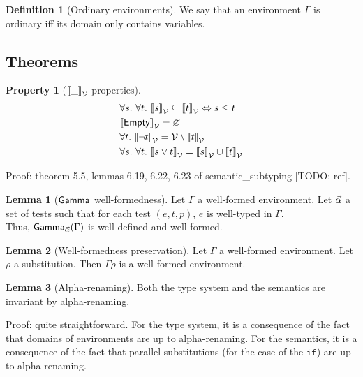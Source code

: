 \documentclass[a4paper]{article}
\theoremstyle{definition}
\newtheorem{lemma}{Lemma}
\newtheorem{definition}{Definition}
\newtheorem{property}{Property}
\begin{document}
      \begin{definition}[Ordinary environments]
        We say that an environment $\Gamma$ is ordinary iff its domain only contains variables.
      \end{definition}
    
        \subsection{Theorems}

        \begin{property}[${\llbracket \_ \rrbracket}_{\mathcal{V}}$ properties]
          \begin{align*}
            &\forall s.\ \forall t.\ {\llbracket s \rrbracket}_{\mathcal{V}} \subseteq {\llbracket t \rrbracket}_{\mathcal{V}} \Leftrightarrow s \leq t\\
            &{\llbracket \textsf{Empty} \rrbracket}_{\mathcal{V}} = \varnothing\\
            &\forall t.\ {\llbracket \neg t \rrbracket}_{\mathcal{V}} = \mathcal{V} \setminus {\llbracket t \rrbracket}_{\mathcal{V}}\\
            &\forall s.\ \forall t.\ {\llbracket s\vee t \rrbracket}_{\mathcal{V}} = {\llbracket s \rrbracket}_{\mathcal{V}} \cup {\llbracket t \rrbracket}_{\mathcal{V}}
          \end{align*}
        \end{property}
        Proof: theorem 5.5, lemmas 6.19, 6.22, 6.23 of semantic_subtyping [TODO: ref].

        \begin{lemma}[$\textsf{Gamma}_{} $ well-formedness]
          Let $\Gamma$ a well-formed environment. Let $\vec \alpha$ a set of tests such that for each test $(e,t,p)$, $e$ is well-typed in $\Gamma$.\\
          Thus, $\textsf{Gamma}_{\vec \alpha}(\Gamma)$ is well defined and well-formed.
        \end{lemma}

        \begin{lemma}[Well-formedness preservation]
          Let $\Gamma$ a well-formed environment. Let $\rho$ a substitution.
          Then $\Gamma\rho$ is a well-formed environment.
        \end{lemma}

        \begin{lemma}[Alpha-renaming]
          Both the type system and the semantics are invariant by alpha-renaming.
        \end{lemma}
        Proof: quite straightforward.
        For the type system, it is a consequence of the fact that domains of environments are up to alpha-renaming.
        For the semantics, it is a consequence of the fact that parallel substitutions (for the case of the $\texttt{if}$)
        are up to alpha-renaming.
    
\end{document}
